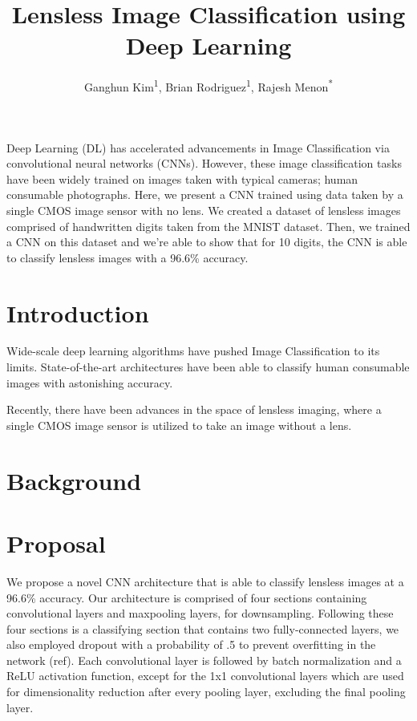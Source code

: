 \documentclass[12pt,conference]{ieeeconf}
\begin{document}
\title{Lensless Image Classification using Deep Learning}
\author{Ganghun Kim\textsuperscript{1}, Brian Rodriguez\textsuperscript{1}, Rajesh Menon\textsuperscript{*}}
\maketitle

\abstract
Deep Learning (DL) has accelerated advancements in Image Classification via convolutional neural networks (CNNs). However, these image classification tasks have been widely trained on images taken with typical cameras; human consumable photographs. Here, we present a CNN trained using data taken by a single CMOS image sensor with no lens. We created a dataset of lensless images comprised of handwritten digits taken from the MNIST dataset. Then, we trained a CNN on this dataset and we're able to show that for 10 digits, the CNN is able to classify lensless images with a 96.6\% accuracy.

\section{Introduction}
Wide-scale deep learning algorithms have pushed Image Classification to its limits. State-of-the-art architectures have been able to classify human consumable images with astonishing accuracy. 

Recently, there have been advances in the space of lensless imaging, where a single CMOS image sensor is utilized to take an image without a lens.

\section{Background}

\section{Proposal}
We propose a novel CNN architecture that is able to classify lensless images at a 96.6\% accuracy. Our architecture is comprised of four sections containing convolutional layers and maxpooling layers, for downsampling. Following these four sections is a classifying section that contains two fully-connected layers, we also employed dropout with a probability of .5 to prevent overfitting in the network (ref). Each convolutional layer is followed by batch normalization and a ReLU activation function, except for the 1x1 convolutional layers which are used for dimensionality reduction after every pooling layer, excluding the final pooling layer.
\end{document}
